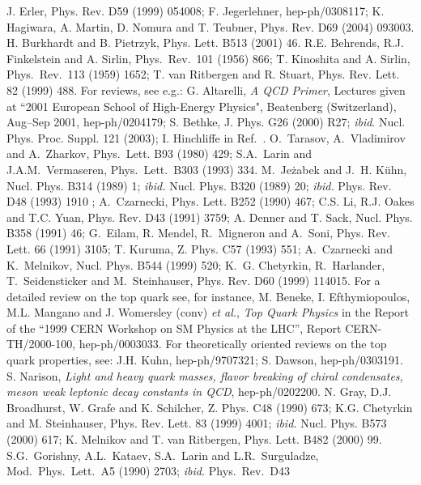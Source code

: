 \begin{thebibliography}{999}
J. Erler, Phys. Rev. D59 (1999) 054008; F. Jegerlehner, hep-ph/0308117; 
K. Hagiwara, A. Martin, D. Nomura and T. Teubner, Phys. Rev. D69 (2004) 
093003.  
%
 H. Burkhardt and B. Pietrzyk, Phys. Lett. B513 (2001) 
46.
%
 R.E. Behrends, R.J. Finkelstein and A. Sirlin,
Phys.~Rev.\ 101 (1956) 866; T. Kinoshita and A. Sirlin, Phys.~Rev.\ 113
(1959) 1652; T. van Ritbergen and R. Stuart, Phys. Rev. Lett. 82 (1999) 488. 
%
 For reviews, see e.g.: 
G. Altarelli, {\it A QCD Primer}, Lectures given at ``2001 European School of 
High-Energy Physics", Beatenberg (Switzerland), Aug--Sep 2001, hep-ph/0204179; 
S. Bethke, J. Phys. G26 (2000) R27; 
{\it ibid}.  Nucl. Phys. Proc. Suppl. 121 (2003);
I. Hinchliffe in Ref.~\cite{PDG}.
%
O.~Tarasov, A.~Vladimirov and A.~Zharkov, Phys.\ Lett. B93 (1980) 429; 
S.A.\ Larin and J.A.M.\ Vermaseren, Phys.\ Lett.\ B303 (1993) 334. 
%
 M.~Je{\.{z}}abek and J.~H. K\"uhn, Nucl. Phys. B314 (1989) 1;  
{\it ibid.}  Nucl. Phys.  B320 (1989) 20; {\it ibid.} Phys. Rev. D48 (1993) 
1910 ; A.~Czarnecki, Phys. Lett. B252 (1990) 467; C.S. Li, R.J. Oakes and  T.C.
Yuan, Phys. Rev. D43 (1991) 3759; A. Denner and T. Sack, Nucl. Phys. B358 
(1991) 46; G.~Eilam, R. Mendel, R.~Migneron and A.~Soni, Phys. Rev.  Lett.  66 
(1991) 3105; T. Kuruma, Z. Phys. C57 (1993) 551; A.~Czarnecki and K.~Melnikov, 
Nucl. Phys. B544 (1999) 520;  K.~G. Chetyrkin, R.~Harlander, T.~Seidensticker 
and M.~Steinhauser, Phys. Rev. D60 (1999) 114015.  
%
 For a detailed review on the top quark see, for instance,
M. Beneke, I. Efthymiopoulos, M.L. Mangano and J. Womersley (conv) {\it et 
al.}, {\it Top Quark Physics} in the Report of the ``1999 CERN Workshop on SM 
Physics at the LHC'', Report CERN-TH/2000-100, hep-ph/0003033. 
%
 For theoretically oriented reviews on the top quark
properties, see: J.H. Kuhn, hep-ph/9707321; S. Dawson, hep-ph/0303191. 
%
 S. Narison, {\it Light and heavy quark masses, flavor 
breaking of chiral condensates,  meson weak leptonic decay constants in QCD},
hep-ph/0202200.  
%
 N. Gray, D.J. Broadhurst, W. Grafe and K. 
Schilcher, Z. Phys. C48 (1990) 673; K.G. Chetyrkin and M. Steinhauser, Phys.
Rev. Lett. 83 (1999) 4001; {\it ibid.} Nucl. Phys. B573 (2000) 617; 
K. Melnikov and T. van Ritbergen, Phys. Lett. B482 (2000) 99.
%
 S.G.\ Gorishny, A.L.\ Kataev, S.A.\ Larin and L.R.\
Surguladze, Mod.\ Phys.\ Lett.\  A5 (1990) 2703; {\it ibid.} Phys.~Rev.~D43

\end{thebibliography}
